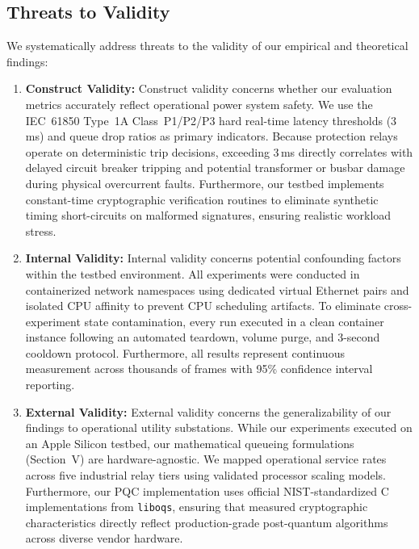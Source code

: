 \documentclass{ieeeaccess}
\begin{document}
\subsection{Threats to Validity}
\label{sec:threats_to_validity}
We systematically address threats to the validity of our empirical and theoretical findings:

\begin{enumerate}[leftmargin=*]
    \item \textbf{Construct Validity:} Construct validity concerns whether our evaluation metrics accurately reflect operational power system safety. We use the IEC~61850 Type~1A Class~P1/P2/P3 hard real-time latency thresholds (3\,ms) and queue drop ratios as primary indicators. Because protection relays operate on deterministic trip decisions, exceeding 3\,ms directly correlates with delayed circuit breaker tripping and potential transformer or busbar damage during physical overcurrent faults. Furthermore, our testbed implements constant-time cryptographic verification routines to eliminate synthetic timing short-circuits on malformed signatures, ensuring realistic workload stress.
    
    \item \textbf{Internal Validity:} Internal validity concerns potential confounding factors within the testbed environment. All experiments were conducted in containerized network namespaces using dedicated virtual Ethernet pairs and isolated CPU affinity to prevent CPU scheduling artifacts. To eliminate cross-experiment state contamination, every run executed in a clean container instance following an automated teardown, volume purge, and 3-second cooldown protocol. Furthermore, all results represent continuous measurement across thousands of frames with 95\% confidence interval reporting.
    
    \item \textbf{External Validity:} External validity concerns the generalizability of our findings to operational utility substations. While our experiments executed on an Apple Silicon testbed, our mathematical queueing formulations (Section~V) are hardware-agnostic. We mapped operational service rates across five industrial relay tiers using validated processor scaling models. Furthermore, our PQC implementation uses official NIST-standardized C implementations from \texttt{liboqs}, ensuring that measured cryptographic characteristics directly reflect production-grade post-quantum algorithms across diverse vendor hardware.
\end{enumerate}
\end{document}
